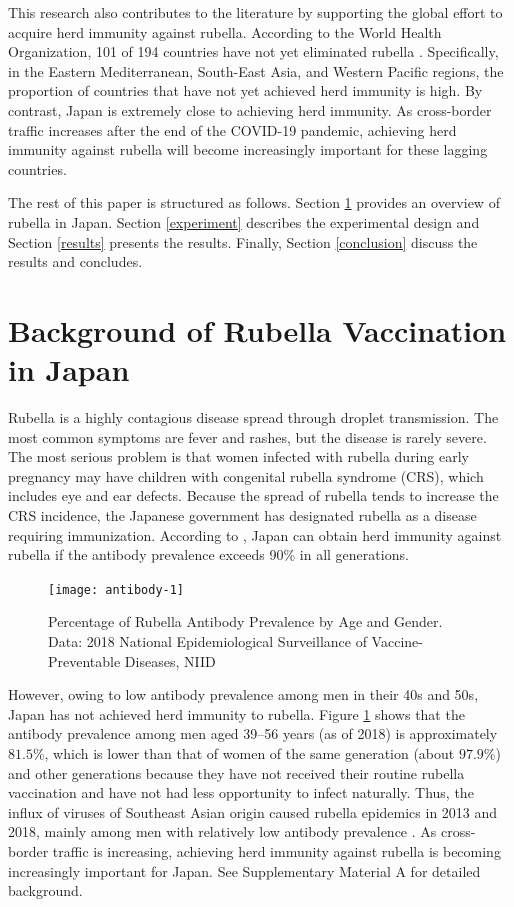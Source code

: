\documentclass[
      12pt,
    a4paper
]{article}
\begin{document}
This research also contributes to the literature by supporting the global effort to acquire herd immunity against rubella. According to the World Health Organization, 101 of 194 countries have not yet eliminated rubella \citep{Zimmerman2022}. Specifically, in the Eastern Mediterranean, South-East Asia, and Western Pacific regions, the proportion of countries that have not yet achieved herd immunity is high. By contrast, Japan is extremely close to achieving herd immunity. As cross-border traffic increases after the end of the COVID-19 pandemic, achieving herd immunity against rubella will become increasingly important for these lagging countries.

The rest of this paper is structured as follows. Section \ref{background} provides an overview of rubella in Japan. Section \ref{experiment} describes the experimental design and Section \ref{results} presents the results. Finally, Section \ref{conclusion} discuss the results and concludes.

\hypertarget{background}{%
\section{Background of Rubella Vaccination in Japan}\label{background}}

Rubella is a highly contagious disease spread through droplet transmission. The most common symptoms are fever and rashes, but the disease is rarely severe. The most serious problem is that women infected with rubella during early pregnancy may have children with congenital rubella syndrome (CRS), which includes eye and ear defects. Because the spread of rubella tends to increase the CRS incidence, the Japanese government has designated rubella as a disease requiring immunization. According to \citet{Kinoshita2016}, Japan can obtain herd immunity against rubella if the antibody prevalence exceeds 90\% in all generations.

\begin{figure}[t]
\texttt{[image: antibody-1]} \caption{Percentage of Rubella Antibody Prevalence by Age and Gender. Data: 2018 National Epidemiological Surveillance of Vaccine-Preventable Diseases, NIID}\label{fig:antibody}
\end{figure}

However, owing to low antibody prevalence among men in their 40s and 50s, Japan has not achieved herd immunity to rubella. Figure \ref{fig:antibody} shows that the antibody prevalence among men aged 39--56 years (as of 2018) is approximately \(81.5\)\%, which is lower than that of women of the same generation (about \(97.9\)\%) and other generations because they have not received their routine rubella vaccination and have not had less opportunity to infect naturally. Thus, the influx of viruses of Southeast Asian origin caused rubella epidemics in 2013 and 2018, mainly among men with relatively low antibody prevalence \citep{NIID2019}. As cross-border traffic is increasing, achieving herd immunity against rubella is becoming increasingly important for Japan. See Supplementary Material A for detailed background.
\end{document}
